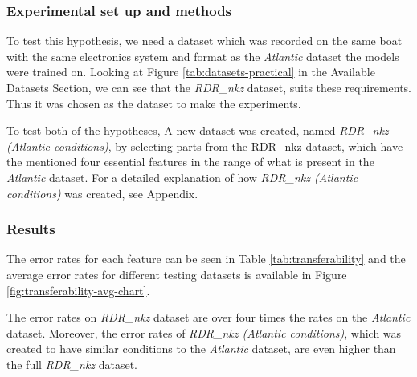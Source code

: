 \documentclass[12pt,twoside]{report}
\begin{document}
\subsubsection{Experimental set up and methods}
To test this hypothesis, we need a dataset which was recorded on the same boat with the same electronics system and format as the \textit{Atlantic} dataset the models were trained on. Looking at Figure \ref{tab:datasets-practical} in the Available Datasets Section, we can see that the \textit{RDR\_nkz} dataset, suits these requirements. Thus it was chosen as the dataset to make the experiments.

To test both of the hypotheses, A new dataset was created, named \textit{RDR\_nkz (Atlantic conditions)}, by selecting parts from the RDR\_nkz dataset, which have the mentioned four essential features in the range of what is present in the \textit{Atlantic} dataset. For a detailed explanation of how \textit{RDR\_nkz (Atlantic conditions)} was created, see Appendix.


\subsubsection{Results}

The error rates for each feature can be seen in Table \ref{tab:transferability} and the average error rates for different testing datasets is available in Figure \ref{fig:transferability-avg-chart}.

The error rates on \textit{RDR\_nkz} dataset are over four times the rates on the \textit{Atlantic} dataset. Moreover, the error rates of \textit{RDR\_nkz (Atlantic conditions)}, which was created to have similar conditions to the \textit{Atlantic} dataset, are even higher than the full \textit{RDR\_nkz} dataset.
\end{document}
